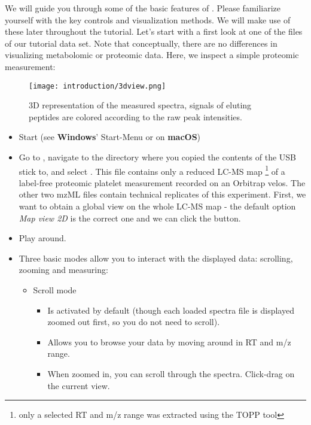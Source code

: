 \noindent We will guide you through some of the basic features of . Please familiarize yourself with the key controls and visualization methods.
We will make use of these later throughout the tutorial. Let's start with a first look at one of the files of our tutorial data set. Note that conceptually, there are no differences in visualizing metabolomic or proteomic data. Here, we inspect a simple proteomic measurement:

\begin{figure}[!htb]
\texttt{[image: introduction/3dview.png]}
\caption{3D representation of the measured spectra, signals of eluting peptides are colored according to the raw peak intensities.}
\label{fig:toppview_3D}
\end{figure}


\begin{itemize}
\item Start  (see \textbf{Windows}' Start-Menu or  on \textbf{macOS})
\item Go to , navigate to the directory where you copied the contents of the USB stick to,
      and select
      . This file contains only a reduced LC-MS map \footnote{only a selected RT and m/z range
      was extracted using the TOPP tool } of a label-free proteomic platelet measurement recorded on an Orbitrap velos.
      The other two mzML files contain technical replicates of this experiment.
      First, we want to obtain a global view on the whole LC-MS map - the default option \textit{Map view 2D} is the correct one and we can click the  button. 
\item Play around.
\item Three basic modes allow you to interact with the displayed data: scrolling, zooming and measuring:
    \begin{itemize}
    \item Scroll mode
        \begin{itemize}
        \item Is activated by default (though each loaded spectra file is displayed zoomed out first, so you do not need to scroll).
        \item Allows you to browse your data by moving around in RT and m/z range.
        \item When zoomed in, you can scroll through the spectra. Click-drag on the current view.

\end{itemize}
\end{itemize}
\end{itemize}
